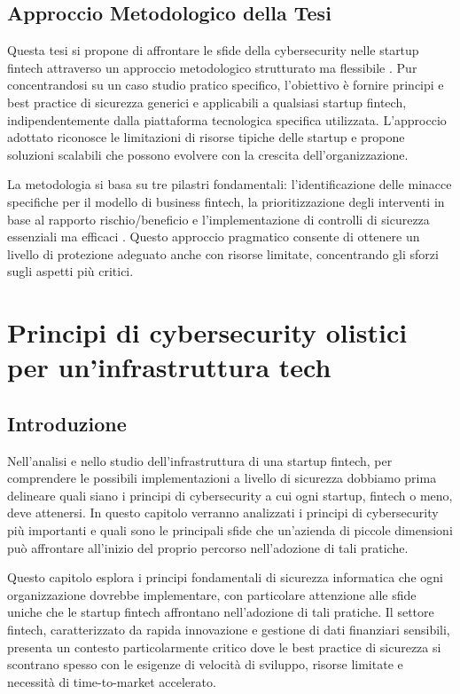 \documentclass[a4paper,12pt]{report}
\begin{document}
\subsection{Approccio Metodologico della Tesi}

Questa tesi si propone di affrontare le sfide della cybersecurity nelle startup fintech attraverso un approccio metodologico strutturato ma flessibile \cite{fintechChallenges}. Pur concentrandosi su un caso studio pratico specifico, l'obiettivo è fornire principi e best practice di sicurezza generici e applicabili a qualsiasi startup fintech, indipendentemente dalla piattaforma tecnologica specifica utilizzata. L'approccio adottato riconosce le limitazioni di risorse tipiche delle startup e propone soluzioni scalabili che possono evolvere con la crescita dell'organizzazione.

La metodologia si basa su tre pilastri fondamentali: l'identificazione delle minacce specifiche per il modello di business fintech, la prioritizzazione degli interventi in base al rapporto rischio/beneficio e l'implementazione di controlli di sicurezza essenziali ma efficaci \cite{fintechChallenges}. Questo approccio pragmatico consente di ottenere un livello di protezione adeguato anche con risorse limitate, concentrando gli sforzi sugli aspetti più critici.

\section{Principi di cybersecurity olistici per un'infrastruttura tech}
\subsection{Introduzione}
Nell'analisi e nello studio dell'infrastruttura di una startup fintech, per comprendere le possibili implementazioni a livello di sicurezza dobbiamo prima delineare quali siano i principi di cybersecurity a cui ogni startup, fintech o meno, deve attenersi. In questo capitolo verranno analizzati i principi di cybersecurity più importanti e quali sono le principali sfide che un'azienda di piccole dimensioni può affrontare all'inizio del proprio percorso nell'adozione di tali pratiche.

Questo capitolo esplora i principi fondamentali di sicurezza informatica che ogni organizzazione dovrebbe implementare, con particolare attenzione alle sfide uniche che le startup fintech affrontano nell'adozione di tali pratiche. Il settore fintech, caratterizzato da rapida innovazione e gestione di dati finanziari sensibili, presenta un contesto particolarmente critico dove le best practice di sicurezza si scontrano spesso con le esigenze di velocità di sviluppo, risorse limitate e necessità di time-to-market accelerato.
\end{document}
